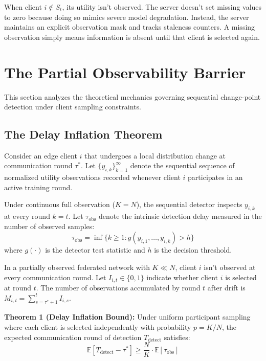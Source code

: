 \documentclass[conference]{IEEEtran}
\begin{document}
When client $i \notin S_t$, its utility isn't observed. The server doesn't set missing values to zero because doing so mimics severe model degradation. Instead, the server maintains an explicit observation mask and tracks staleness counters. A missing observation simply means information is absent until that client is selected again.

\section{The Partial Observability Barrier}
This section analyzes the theoretical mechanics governing sequential change-point detection under client sampling constraints.

\subsection{The Delay Inflation Theorem}
Consider an edge client $i$ that undergoes a local distribution change at communication round $\tau^*$. Let $\{y_{i,k}\}_{k=1}^{\infty}$ denote the sequential sequence of normalized utility observations recorded whenever client $i$ participates in an active training round.

Under continuous full observation ($K = N$), the sequential detector inspects $y_{i,k}$ at every round $k = t$. Let $\tau_{\text{obs}}$ denote the intrinsic detection delay measured in the number of observed samples:
\begin{equation}
\tau_{\text{obs}} = \inf \{k \ge 1 : g(y_{i, 1}, \dots, y_{i, k}) > h\}
\end{equation}
where $g(\cdot)$ is the detector test statistic and $h$ is the decision threshold.

In a partially observed federated network with $K \ll N$, client $i$ isn't observed at every communication round. Let $I_{i,t} \in \{0, 1\}$ indicate whether client $i$ is selected at round $t$. The number of observations accumulated by round $t$ after drift is $M_{i,t} = \sum_{s=\tau^*+1}^t I_{i,s}$.

\textbf{Theorem 1 (Delay Inflation Bound):} Under uniform participant sampling where each client is selected independently with probability $p = K/N$, the expected communication round of detection $T_{\text{detect}}$ satisfies:
\begin{equation}
\mathbb{E}[T_{\text{detect}} - \tau^*] \ge \frac{N}{K} \cdot \mathbb{E}[\tau_{\text{obs}}]
\end{equation}
\end{document}
